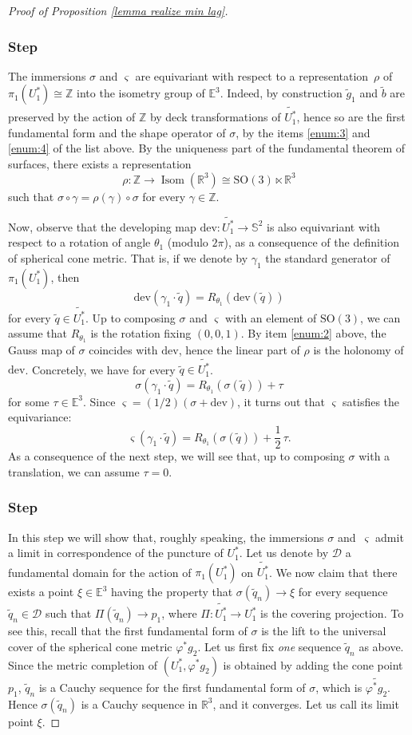 \documentclass[JEP,XML,SOM,Unicode,NoEqCountersInSection,published]{cedram}
\let\mathcal\mathscr
\newcounter{steps}
\newcommand{\step}{\refstepcounter{steps}\subsubsection*{Step \thesteps}}
\theoremstyle{definition}
\newcommand{\R}{{\mathbb R}}
\newcommand{\E}{\mathbb{E}}
\newcommand{\dev}{\mathrm{dev}}
\newcommand{\SO}{\mathrm{SO}}
\DeclareMathOperator{\Isom}{Isom}
\begin{document}
\begin{proof}[Proof of Proposition \ref{lemma realize min lag}]
\step\label{step:2}
The immersions $\sigma$ and $ \varsigma$ are equivariant with respect to a representation~$\rho$ of $\pi_1(U_1^*)\cong\mathbb Z$ into the isometry group of $\E^3$. Indeed, by construction $\widetilde g_1$ and $\widetilde b$ are preserved by the action of $\mathbb Z$ by deck transformations of $\widetilde{U_1^*}$, hence so are the first fundamental form and the shape operator of $ \sigma$, by the items \eqref{enum:3} and \eqref{enum:4} of the list above. By the uniqueness part of the fundamental theorem of surfaces, there exists a representation
\[
\rho:\mathbb Z\to\Isom(\R^3)\cong\SO(3)\ltimes\R^3
\] such that $\sigma\circ \gamma=\rho(\gamma)\circ\sigma$ for every $\gamma\in\mathbb Z$.

Now, observe that the developing map $\dev:\widetilde{U_1^*}\to\mathbb S^2$ is also equivariant with respect to a rotation of angle $\theta_1$ (modulo $2\pi$), as a consequence of the definition of spherical cone metric. That is, if we denote by $\gamma_1$ the standard generator of $\pi_1(U_1^*)$, then
\[
\dev(\gamma_1\cdot \widetilde q)=R_{\theta_1}(\dev(\widetilde q))
\]
for every $\widetilde q\in \widetilde{U_1^*}$.
Up to composing $\sigma$ and $\varsigma$ with an element of $\SO(3)$, we can assume that $R_{\theta_1}$ is the rotation fixing $(0,0,1)$.
By item \eqref{enum:2} above, the Gauss map of $\sigma$ coincides with $\dev$, hence the linear part of $\rho$ is the holonomy of $\dev$. Concretely, we have for every $\widetilde q\in \widetilde{U_1^*}$.
\[
\sigma(\gamma_1\cdot \widetilde q)=R_{\theta_1}(\sigma(\widetilde q))+\tau
\]
for some $\tau\in \E^3$. Since $\varsigma=(1/2)(\sigma+\dev)$, it turns out that $\varsigma$ satisfies the equivariance:
\[
\varsigma(\gamma_1\cdot \widetilde q)=R_{\theta_1}(\sigma(\widetilde q))+\frac{1}{2}\,\tau.
\]
As a consequence of the next step, we will see that, up to composing $\sigma$ with a translation, we can assume $\tau=0$.

\step\label{step:3}
In this step we will show that, roughly speaking, the immersions $\sigma$ and~$\varsigma$ admit a limit in correspondence of the puncture of $U_1^*$. Let us denote by $\mathcal D$ a fundamental domain for the action of $\pi_1(U_1^*)$ on $\widetilde{U_1^*}$. We now claim that there exists a point $\xi\in\E^3$ having the property that $\sigma(\widetilde q_n)\to \xi$ for every sequence $\widetilde q_n\in\mathcal D$ such that $\Pi(\widetilde q_n)\to p_1$, where $\Pi:\widetilde{U_1^*}\to U_1^*$ is the covering projection.
To see this, recall that the first fundamental form of $\sigma$ is the lift to the universal cover of the spherical cone metric $\varphi^*g_2$. Let us first fix \emph{one} sequence $\widetilde q_n$ as above. Since the metric completion of $(U_1^*,\varphi^*g_2)$ is obtained by adding the cone point $p_1$, $\widetilde q_n$ is a Cauchy sequence for the first fundamental form of $\sigma$, which is $\widetilde{\varphi^*g_2}$. Hence $\sigma(\widetilde q_n)$ is a Cauchy sequence in $\R^3$, and it converges. Let us call its limit point $\xi$.


\end{proof}
\end{document}
